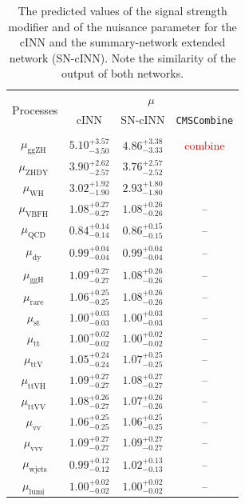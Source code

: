 \begin{table}[h!]
	\centering
	\begin{tabular}{cccc}
		\multirow{2}{*}{Processes} & \multicolumn{3}{c}{$\mu$} \\
		 & cINN & SN-cINN & \texttt{CMSCombine} \\
		 \hline\\
		$\mu_\text{ggZH } $ & $5.10^{+3.57}_{-3.50}$ & $4.86^{+3.38}_{-3.33}$ &  \textcolor{red}{combine}  \\[0.3em]
		$\mu_\text{ZHDY } $ & $3.90^{+2.62}_{-2.57}$ & $3.76^{+2.57}_{-2.52}$ &    \\[0.3em]
		$\mu_\text{WH   } $ & $3.02^{+1.92}_{-1.90}$ & $2.93^{+1.80}_{-1.80}$ &    \\[0.3em]
		$\mu_\text{VBFH } $ & $1.08^{+0.27}_{-0.27}$ & $1.08^{+0.26}_{-0.26}$ & -- \\[0.3em]
		$\mu_\text{QCD  } $ & $0.84^{+0.14}_{-0.14}$ & $0.86^{+0.15}_{-0.15}$ & -- \\[0.3em]
		$\mu_\text{dy   } $ & $0.99^{+0.04}_{-0.04}$ & $0.99^{+0.04}_{-0.04}$ & -- \\[0.3em]
		$\mu_\text{ggH  } $ & $1.09^{+0.27}_{-0.27}$ & $1.08^{+0.26}_{-0.26}$ & -- \\[0.3em]
		$\mu_\text{rare } $ & $1.06^{+0.25}_{-0.25}$ & $1.08^{+0.26}_{-0.26}$ & -- \\[0.3em]
		$\mu_\text{st   } $ & $1.00^{+0.03}_{-0.03}$ & $1.00^{+0.03}_{-0.03}$ & -- \\[0.3em]
		$\mu_\text{tt   } $ & $1.00^{+0.02}_{-0.02}$ & $1.00^{+0.02}_{-0.02}$ & -- \\[0.3em]
		$\mu_\text{ttV  } $ & $1.05^{+0.24}_{-0.24}$ & $1.07^{+0.25}_{-0.25}$ & -- \\[0.3em]
		$\mu_\text{ttVH } $ & $1.09^{+0.27}_{-0.27}$ & $1.08^{+0.27}_{-0.27}$ & -- \\[0.3em]
		$\mu_\text{ttVV } $ & $1.08^{+0.26}_{-0.27}$ & $1.07^{+0.26}_{-0.26}$ & -- \\[0.3em]
		$\mu_\text{vv   } $ & $1.06^{+0.25}_{-0.25}$ & $1.06^{+0.25}_{-0.25}$ & -- \\[0.3em]
		$\mu_\text{vvv  } $ & $1.09^{+0.27}_{-0.27}$ & $1.09^{+0.27}_{-0.27}$ & -- \\[0.3em]
		$\mu_\text{wjets} $ & $0.99^{+0.12}_{-0.12}$ & $1.02^{+0.13}_{-0.13}$ & -- \\[0.3em]
		$\mu_\text{lumi } $ & $1.00^{+0.02}_{-0.02}$ & $1.00^{+0.02}_{-0.02}$ & -- \\[0.3em]
		\hline
	\end{tabular}
	\caption{The predicted values of the signal strength modifier and of the nuisance parameter for the cINN and the summary-network extended network (SN-cINN). Note the similarity of the output of both networks.}
	\label{tab:inference_res}
\end{table}
